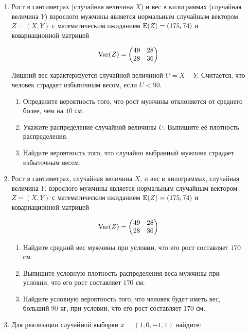 \begin{enumerate}

\item Рост в сантиметрах (случайная величина $X$) и вес в килограммах (случайная величина $Y$) взрослого мужчины является нормальным случайным вектором $Z = (X, Y)$ с математическим ожиданием $\operatorname{E}(Z) = (175, 74)$ и ковариационной матрицей

\[
\operatorname{Var}(Z) =
\begin{pmatrix}
 49 & 28 \\
28 & 36
\end{pmatrix}
\]

Лишний вес характеризуется случайной величиной $U = X - Y$. Считается, что человек страдает избыточным весом, если $U < 90$.

\begin{enumerate}
\item Определите вероятность того, что рост мужчины отклоняется от среднего более, чем на $10$ см.
\item Укажите распределение случайной величины $U$. Выпишите её плотность распределения.
\item Найдите вероятность того, что случайно выбранный мужчина страдает избыточным весом.
\end{enumerate}

\item Рост в сантиметрах, случайная величина $X$, и вес в килограммах, случайная величина $Y$, взрослого мужчины является нормальным случайным вектором $Z = (X, Y)$ с математическим ожиданием $\operatorname{E}(Z) = (175, 74)$ и ковариационной матрицей

\[
\operatorname{Var}(Z) =
\begin{pmatrix}
 49 & 28 \\
28 & 36
\end{pmatrix}
\]

\begin{enumerate}
\item Найдите средний вес мужчины при условии, что его рост составляет $170$ см.
\item Выпишите условную плотность распределения веса мужчины при условии, что его рост составляет $170$ см.
\item Найдите условную вероятность того, что человек будет иметь вес, больший $90$ кг, при условии, что его рост составляет $170$ см.
\end{enumerate}

\item Для реализации случайной выборки $x=(1,0,-1,1)$ найдите:


\end{enumerate}
